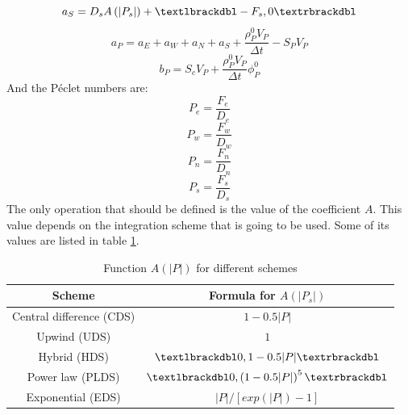 \begin{equation}
a_{S}=D_{s}A\left(|P_{s}|\right)+\textlbrackdbl-F_{s},0\textrbrackdbl
\end{equation}
\begin{equation}
a_{P}=a_{E}+a_{W}+a_{N}+a_{S}+\frac{\rho_{P}^{0}V_{P}}{\Delta t}-S_{P}V_{P}
\end{equation}
\begin{equation}
b_{P}=S_{c}V_{P}+\frac{\rho_{P}^{0}V_{P}}{\Delta t}\phi_{P}^{0}
\end{equation}
And the Péclet numbers are:
\begin{equation}
P_{e}=\frac{F_{e}}{D_{e}}
\end{equation}
\begin{equation}
P_{w}=\frac{F_{w}}{D_{w}}
\end{equation}
\begin{equation}
P_{n}=\frac{F_{n}}{D_{n}}
\end{equation}
\begin{equation}
P_{s}=\frac{F_{s}}{D_{s}}
\end{equation}
The only operation that should be defined is the value of the coefficient $A$. This value depends on the integration scheme that is going to be used. Some of its values are listed in table \ref{Patankarvalues}.
\begin{table}
	\centering
	\begin{tabular}{ |c|c| }
		\hline
		Scheme & Formula for $A\left(|P_{s}|\right)$ \\ \hline
		Central difference (CDS) & $1-0.5|P|$ \\ \hline
		Upwind (UDS) & $1$ \\ \hline
		Hybrid (HDS) & $\textlbrackdbl0,1-0.5|P|\textrbrackdbl$ \\ \hline
		Power law (PLDS) & $\textlbrackdbl0,\left(1-0.5|P|\right)^{5}\textrbrackdbl$ \\ \hline
		Exponential (EDS) & $|P|/\left[exp\left(|P|\right)-1\right]$ \\ \hline
	\end{tabular}
\caption{Function $A(|P|)$ for different schemes\cite{Patankar}}
\label{Patankarvalues}
\end{table}